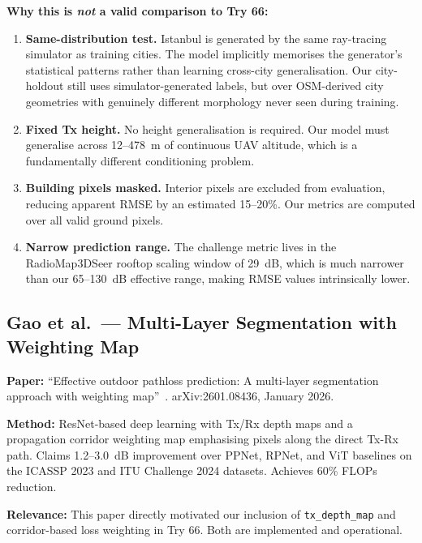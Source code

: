 \documentclass[11pt,a4paper]{article}
\begin{document}
\textbf{Why this is \emph{not} a valid comparison to Try 66:}

\begin{enumerate}[nosep]
    \item \textbf{Same-distribution test.} Istanbul is generated by the same
          ray-tracing simulator as training cities. The model implicitly memorises
          the generator's statistical patterns rather than learning cross-city
          generalisation. Our city-holdout still uses simulator-generated labels,
          but over OSM-derived city geometries with genuinely different morphology
          never seen during training.

    \item \textbf{Fixed Tx height.} No height generalisation is required.
          Our model must generalise across 12--478~m of continuous UAV altitude,
          which is a fundamentally different conditioning problem.

    \item \textbf{Building pixels masked.} Interior pixels are excluded from
          evaluation, reducing apparent RMSE by an estimated 15--20\%. Our metrics
          are computed over all valid ground pixels.

    \item \textbf{Narrow prediction range.} The challenge metric lives in the
          RadioMap3DSeer rooftop scaling window of 29~dB, which is much narrower
          than our 65--130~dB effective range, making RMSE values intrinsically lower.
\end{enumerate}

\subsection{Gao et al.\ --- Multi-Layer Segmentation with Weighting Map}

\textbf{Paper:} ``Effective outdoor pathloss prediction: A multi-layer segmentation
approach with weighting map''~\cite{gao2026}. arXiv:2601.08436, January 2026.

\textbf{Method:} ResNet-based deep learning with Tx/Rx depth maps and a propagation
corridor weighting map emphasising pixels along the direct Tx-Rx path.
Claims 1.2--3.0~dB improvement over PPNet, RPNet, and ViT baselines on the ICASSP
2023 and ITU Challenge 2024 datasets. Achieves 60\% FLOPs reduction.

\textbf{Relevance:} This paper directly motivated our inclusion of \texttt{tx\_depth\_map}
and corridor-based loss weighting in Try 66. Both are implemented and operational.
\end{document}

